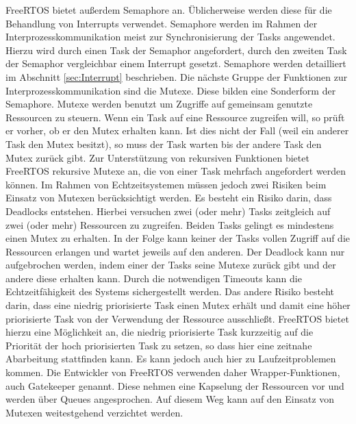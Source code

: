 FreeRTOS bietet außerdem Semaphore an. Üblicherweise werden diese für die Behandlung von Interrupts verwendet. Semaphore werden im Rahmen der Interprozesskommunikation meist zur Synchronisierung der Tasks angewendet. Hierzu wird durch einen Task der Semaphor angefordert, durch den zweiten Task der Semaphor vergleichbar einem Interrupt gesetzt. Semaphore werden detailliert im Abschnitt \ref{sec:Interrupt} beschrieben.\newline
Die nächste Gruppe der Funktionen zur Interprozesskommunikation sind die Mutexe. Diese bilden eine Sonderform der Semaphore.  Mutexe werden benutzt um Zugriffe auf gemeinsam genutzte Ressourcen zu steuern. Wenn ein Task auf eine Ressource zugreifen will, so prüft er vorher, ob er den Mutex erhalten kann. Ist dies nicht der Fall (weil ein anderer Task den Mutex besitzt), so muss der Task warten bis der andere Task den Mutex zurück gibt. Zur Unterstützung von rekursiven Funktionen bietet FreeRTOS rekursive Mutexe an, die von einer Task mehrfach angefordert werden können. Im Rahmen von Echtzeitsystemen müssen jedoch zwei Risiken beim Einsatz von Mutexen berücksichtigt werden. Es besteht ein Risiko darin, dass Deadlocks entstehen. Hierbei versuchen zwei (oder mehr) Tasks zeitgleich auf zwei (oder mehr) Ressourcen zu zugreifen. Beiden Tasks gelingt es mindestens einen Mutex zu erhalten. In der Folge kann keiner der Tasks vollen Zugriff auf die Ressourcen erlangen und wartet jeweils auf den anderen. Der Deadlock kann nur aufgebrochen werden, indem einer der Tasks seine Mutexe zurück gibt und der andere diese erhalten kann. Durch die notwendigen Timeouts kann die Echt\-zeit\-fähig\-keit des Systems sichergestellt werden. Das andere Risiko besteht darin, dass eine niedrig priorisierte Task einen Mutex erhält und damit eine höher priorisierte Task von der Verwendung der Ressource ausschließt. FreeRTOS bietet hierzu eine Möglichkeit an, die niedrig priorisierte Task kurzzeitig auf die Priorität der hoch priorisierten Task zu setzen, so dass hier eine zeitnahe Abarbeitung stattfinden kann. Es kann jedoch auch hier zu Laufzeitproblemen kommen. Die Entwickler von FreeRTOS verwenden daher Wrapper-Funktionen, auch Gatekeeper genannt. Diese nehmen eine Kapselung der Ressourcen vor und werden über Queues angesprochen. Auf diesem Weg kann auf den Einsatz von Mutexen weitestgehend verzichtet werden.
